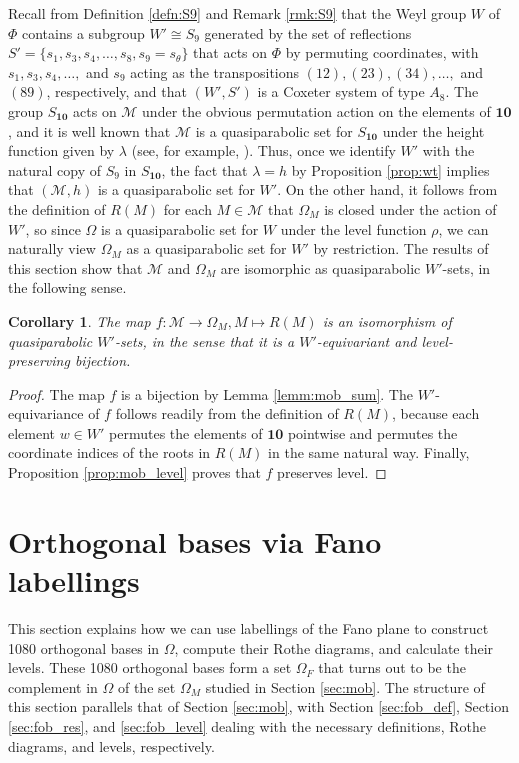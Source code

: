 \documentclass[11pt]{amsart}
\theoremstyle{plain}
\newtheorem{cor}[theorem]{Corollary}
\theoremstyle{definition}
\theoremstyle{remark}
\numberwithin{equation}{section}
\newcommand{\ra}{\rightarrow}
\newcommand{\calm}{\mathcal{M}}
\newcommand{\ten}{\mathbf{10}}
\newcommand{\ob}{\Omega}
\newcommand{\fob}{\Omega_F}
\newcommand{\mob}{\Omega_M}
\begin{document}
Recall from Definition \ref{defn:S9} and Remark \ref{rmk:S9} that the Weyl group
$W$ of $\Phi$ contains a subgroup $W'\cong S_9$ generated by the set of
reflections $S'=\{s_1, s_3, s_4, \dots, s_8, s_9=s_\theta\}$ that acts on
$\Phi$ by permuting coordinates, with $s_1, s_3, s_4, \dots,$ and $s_9$ acting
as the transpositions $(12), (23), (34), \dots,$ and $(89)$, respectively,  and
that $(W',S')$ is a Coxeter system of type $A_8$. The group $S_\ten$ acts on
$\calm$ under the obvious permutation action on the elements of $\ten$, and it
is well known that $\calm$ is a quasiparabolic set for $S_\ten$ under the height
function given by $\lambda$ (see, for example, \cite[Theorem 4.6]{rains13}).
Thus, once we identify $W'$ with the natural copy of $S_9$ in $S_\ten$, the fact
that $\lambda=h$ by Proposition \ref{prop:wt} implies that $(\calm,h)$ is a
quasiparabolic set for $W'$. On the other hand, it follows from the definition
of $R(M)$ for each $M\in \calm$ that $\mob$ is closed under the action of $W'$,
so since $\ob$ is a quasiparabolic set for $W$ under the level function $\rho$,
we can naturally view $\mob$ as a quasiparabolic set for $W'$ by restriction.
The results of this section show that $\calm$ and $\mob$ are isomorphic as
quasiparabolic $W'$-sets, in the following sense.

\begin{cor}
\label{cor:matching_iso}
The map $f: \calm\ra \mob, M\mapsto R(M)$ is an isomorphism of quasiparabolic
$W'$-sets, in the sense that it is a $W'$-equivariant and level-preserving 
bijection.
\end{cor}

\begin{proof}
The map $f$ is a bijection by Lemma \ref{lemm:mob_sum}. The $W'$-equivariance of
$f$ follows readily from the definition of $R(M)$,  because each element $w\in
W'$ permutes the elements of $\ten$ pointwise and permutes the coordinate indices of
the roots in $R(M)$ in the same natural way. Finally, Proposition
\ref{prop:mob_level} proves that $f$ preserves level. 
\end{proof}

\section{Orthogonal bases via Fano labellings}
\label{sec:fob}
This section explains how we can use labellings of the Fano plane to construct
1080 orthogonal bases in $\ob$, compute their Rothe diagrams, and calculate
their levels. These 1080 orthogonal bases form a set $\fob$ that turns out to
be the complement in $\ob$ of the set $\Omega_M$ studied in Section \ref{sec:mob}. The structure
of this section parallels that of Section \ref{sec:mob}, with Section
\ref{sec:fob_def}, Section \ref{sec:fob_res}, and \ref{sec:fob_level} dealing
with the necessary definitions, Rothe diagrams, and levels, respectively. 
\end{document}
